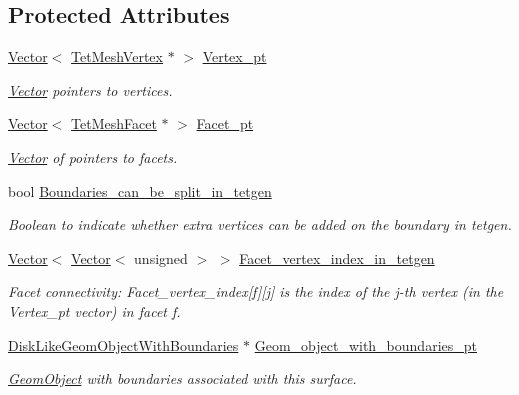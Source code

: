 \subsection*{Protected Attributes}
\begin{DoxyCompactItemize}
\item 
\hyperlink{classoomph_1_1Vector}{Vector}$<$ \hyperlink{classoomph_1_1TetMeshVertex}{Tet\+Mesh\+Vertex} $\ast$ $>$ \hyperlink{classoomph_1_1TetMeshFacetedSurface_a5a755b2062fa4ed18f3bdd18236b0f72}{Vertex\+\_\+pt}
\begin{DoxyCompactList}\small\item\em \hyperlink{classoomph_1_1Vector}{Vector} pointers to vertices. \end{DoxyCompactList}\item 
\hyperlink{classoomph_1_1Vector}{Vector}$<$ \hyperlink{classoomph_1_1TetMeshFacet}{Tet\+Mesh\+Facet} $\ast$ $>$ \hyperlink{classoomph_1_1TetMeshFacetedSurface_a84ddd979ab9031b80c6328b150669986}{Facet\+\_\+pt}
\begin{DoxyCompactList}\small\item\em \hyperlink{classoomph_1_1Vector}{Vector} of pointers to facets. \end{DoxyCompactList}\item 
bool \hyperlink{classoomph_1_1TetMeshFacetedSurface_a0d42b95b2097482d25a727a0f6fd7605}{Boundaries\+\_\+can\+\_\+be\+\_\+split\+\_\+in\+\_\+tetgen}
\begin{DoxyCompactList}\small\item\em Boolean to indicate whether extra vertices can be added on the boundary in tetgen. \end{DoxyCompactList}\item 
\hyperlink{classoomph_1_1Vector}{Vector}$<$ \hyperlink{classoomph_1_1Vector}{Vector}$<$ unsigned $>$ $>$ \hyperlink{classoomph_1_1TetMeshFacetedSurface_a609f107e2737cec4b52b81977464c02b}{Facet\+\_\+vertex\+\_\+index\+\_\+in\+\_\+tetgen}
\begin{DoxyCompactList}\small\item\em Facet connectivity\+: Facet\+\_\+vertex\+\_\+index\mbox{[}f\mbox{]}\mbox{[}j\mbox{]} is the index of the j-\/th vertex (in the Vertex\+\_\+pt vector) in facet f. \end{DoxyCompactList}\item 
\hyperlink{classoomph_1_1DiskLikeGeomObjectWithBoundaries}{Disk\+Like\+Geom\+Object\+With\+Boundaries} $\ast$ \hyperlink{classoomph_1_1TetMeshFacetedSurface_a6d5836261116c9fc17afa725fcd63bd1}{Geom\+\_\+object\+\_\+with\+\_\+boundaries\+\_\+pt}
\begin{DoxyCompactList}\small\item\em \hyperlink{classoomph_1_1GeomObject}{Geom\+Object} with boundaries associated with this surface. \end{DoxyCompactList}\end{DoxyCompactItemize}
